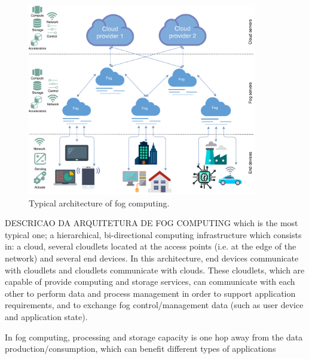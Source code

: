 


\begin{figure}
	\centering
	\includegraphics[width=100mm]{images/fog_architecture/fog_architecture}
	\caption{Typical architecture of fog computing.}
	\label{fog_architecture}
\end{figure}

DESCRICAO DA ARQUITETURA DE FOG COMPUTING
which is the most typical one; a hierarchical, bi-directional computing infrastructure which consists in: a cloud, several cloudlets located at the access points (i.e. at the edge of the network) and several end devices. In this architecture, end devices communicate with cloudlets and cloudlets communicate with clouds. These cloudlets, which are capable of provide computing and storage services, can communicate with each other to perform data and process management in order to support application requirements, and to exchange fog control/management data (such as user device and application state).

In fog computing, processing and storage capacity is one hop away from the data production/consumption, which can benefit different types of applications

